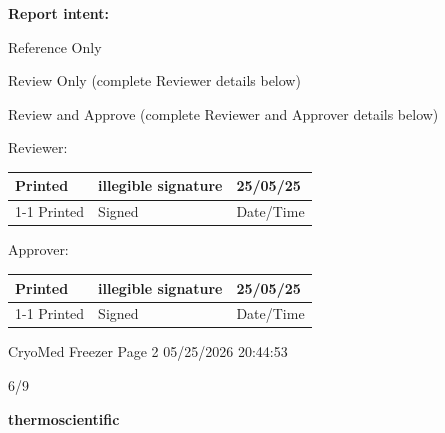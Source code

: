 \documentclass[UTF8,10pt,a4paper,fontset=fandol]{ctexart}
\newcommand{\fieldvalue}[1]{#1}
\newcommand{\handwritten}[1]{#1}
\begin{document}
\vspace{1em}

\noindent\textbf{Report intent:}

\noindent[ ] Reference Only

\noindent[ ] Review Only (complete Reviewer details below)

\noindent[ ] Review and Approve (complete Reviewer and Approver details below)

\vspace{0.5em}

\noindent Reviewer:

\begin{tabular}{p{} p{} p{}}
Printed & 
\fieldvalue{\handwritten{illegible signature}} &
\fieldvalue{\handwritten{25/05/25}} \\
\cline{1-1}\cline{2-2}\cline{3-3}
Printed & Signed & Date/Time
\end{tabular}

\vspace{0.5em}

\noindent Approver:

\begin{tabular}{p{} p{} p{}}
Printed &
\fieldvalue{\handwritten{illegible signature}} &
\fieldvalue{\handwritten{25/05/25}} \\
\cline{1-1}\cline{2-2}\cline{3-3}
Printed & Signed & Date/Time
\end{tabular}

\vfill

\noindent CryoMed Freezer \hfill Page 2 \hfill 05/25/2026 20:44:53

\noindent\hfill\handwritten{6/9}

\newpage

\begin{flushright}
\textbf{thermo\textsf{scientific}}
\end{flushright}
\end{document}
